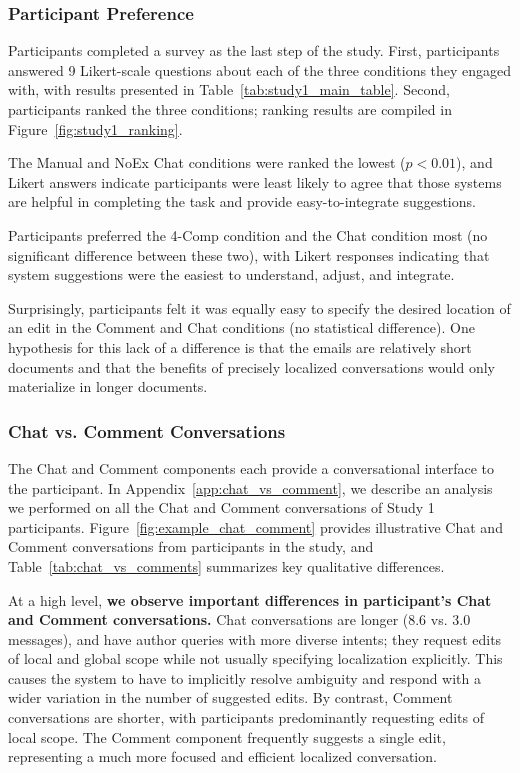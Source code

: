 \documentclass[manuscript]{acmart}
\begin{document}
\subsubsection{Participant Preference} \label{sec:study1_evaluation_preference}

Participants completed a survey as the last step of the study. First, participants answered 9 Likert-scale questions about each of the three conditions they engaged with, with results presented in Table~\ref{tab:study1_main_table}. Second, participants ranked the three conditions; ranking results are compiled in Figure~\ref{fig:study1_ranking}.

The Manual and NoEx Chat conditions were ranked the lowest ($p<0.01$), and Likert answers indicate participants were least likely to agree that those systems are helpful in completing the task and provide easy-to-integrate suggestions. 

Participants preferred the 4-Comp condition and the Chat condition most (no significant difference between these two), with Likert responses indicating that system suggestions were the easiest to understand, adjust, and integrate.

Surprisingly, participants felt it was equally easy to specify the desired location of an edit in the Comment and Chat conditions (no statistical difference). One hypothesis for this lack of a difference is that the emails are relatively short documents and that the benefits of precisely localized conversations would only materialize in longer documents.

\subsubsection{Chat vs. Comment Conversations} \label{sec:study1_chat_v_comment}

The Chat and Comment components each provide a conversational interface to the participant. In Appendix~\ref{app:chat_vs_comment}, we describe an analysis we performed on all the Chat and Comment conversations of Study 1 participants. Figure~\ref{fig:example_chat_comment} provides illustrative Chat and Comment conversations from participants in the study, and Table~\ref{tab:chat_vs_comments} summarizes key qualitative differences.

At a high level, \textbf{we observe important differences in participant's Chat and Comment conversations.} Chat conversations are longer (8.6 vs. 3.0 messages), and have author queries with more diverse intents; they request edits of local and global scope while not usually specifying localization explicitly. This causes the system to have to implicitly resolve ambiguity and respond with a wider variation in the number of suggested edits. By contrast, Comment conversations are shorter, with participants predominantly requesting edits of local scope. The Comment component frequently suggests a single edit, representing a much more focused and efficient localized conversation.
\end{document}

